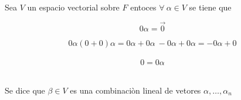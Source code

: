 		\begin{proposicion} Sea $V$ un espacio vectorial sobre $F$ entoces $\forall \ \alpha \in V$ se tiene que  
		
		\end{proposicion}
		 
		 \begin{equation}
		 0 \alpha = \overrightarrow{0} 
		 \end{equation}
		 
		 \begin{equation}
		 0 \alpha ( 0 + 0 ) \alpha = 0 \alpha + 0 \alpha \
		 - 0 \alpha + 0 \alpha = - 0 \alpha + 0 
		 \end{equation}
			\\
		\begin{equation}
		0 = 0 \alpha
		\end{equation}		
	\\	
		
	\begin{definicion}
	Se dice que $\beta \in V $ es una combinaci\`on lineal de vetores $\alpha , \dots , \alpha_n$
	\end{definicion}	 